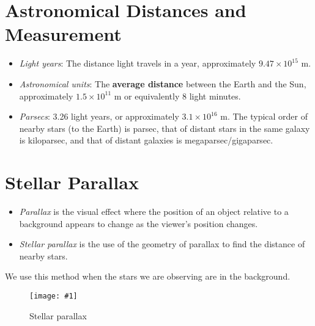 \documentclass[a4paper,12pt]{article}
\let\oldsection\section
\renewcommand\section{\clearpage\oldsection}
\newcommand{\img}[4]{\begin{center}
  \begin{figure}[H]
    \centering
    \texttt{[image: \#1]}
    \caption{#3}
    \label{fig:#4}
  \end{figure}
\end{center}}
\begin{document}
\section{Astronomical Distances and Measurement}

\begin{itemize}
  \item \textit{Light years}: The distance light travels in a year, approximately $9.47\times 10^{15}$ m.
  \item \textit{Astronomical units}: The \textbf{average distance} between the Earth and the Sun, approximately $1.5\times 10^{11}$ m or equivalently 8 light minutes.
  \item \textit{Parsecs}: 3.26 light years, or approximately $3.1\times 10^{16}$ m. The typical order of nearby stars (to the Earth) is parsec, that of distant stars in the same galaxy is kiloparsec, and that of distant galaxies is megaparsec/gigaparsec.
\end{itemize}

\section{Stellar Parallax}

\begin{itemize}
  \item \textit{Parallax} is the visual effect where the position of an object relative to a background appears to change as the viewer's position changes.
  \item \textit{Stellar parallax} is the use of the geometry of parallax to find the distance of nearby stars.
\end{itemize}

We use this method when the stars we are observing are  in the background.

\img{stellarparallax.png}{1}{Stellar parallax}{stellarparallax}

\pagebreak
\end{document}
